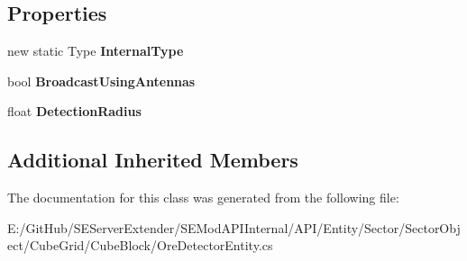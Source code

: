 \subsection*{Properties}
\begin{DoxyCompactItemize}
\item 
\hypertarget{class_s_e_mod_a_p_i_internal_1_1_a_p_i_1_1_entity_1_1_sector_1_1_sector_object_1_1_cube_grid_1_1734c0c906221c912328658de70b50f1a_a93da9667b8adff83b2e716f688764030}{}new static Type {\bfseries Internal\+Type}\label{class_s_e_mod_a_p_i_internal_1_1_a_p_i_1_1_entity_1_1_sector_1_1_sector_object_1_1_cube_grid_1_1734c0c906221c912328658de70b50f1a_a93da9667b8adff83b2e716f688764030}

\item 
\hypertarget{class_s_e_mod_a_p_i_internal_1_1_a_p_i_1_1_entity_1_1_sector_1_1_sector_object_1_1_cube_grid_1_1734c0c906221c912328658de70b50f1a_a3a35605dcc0e1ee788a25167d3be9a32}{}bool {\bfseries Broadcast\+Using\+Antennas}\label{class_s_e_mod_a_p_i_internal_1_1_a_p_i_1_1_entity_1_1_sector_1_1_sector_object_1_1_cube_grid_1_1734c0c906221c912328658de70b50f1a_a3a35605dcc0e1ee788a25167d3be9a32}

\item 
\hypertarget{class_s_e_mod_a_p_i_internal_1_1_a_p_i_1_1_entity_1_1_sector_1_1_sector_object_1_1_cube_grid_1_1734c0c906221c912328658de70b50f1a_a28eae8d4a3dd22b6ae3304aa7ddb9def}{}float {\bfseries Detection\+Radius}\label{class_s_e_mod_a_p_i_internal_1_1_a_p_i_1_1_entity_1_1_sector_1_1_sector_object_1_1_cube_grid_1_1734c0c906221c912328658de70b50f1a_a28eae8d4a3dd22b6ae3304aa7ddb9def}

\end{DoxyCompactItemize}
\subsection*{Additional Inherited Members}


The documentation for this class was generated from the following file\+:\begin{DoxyCompactItemize}
\item 
E\+:/\+Git\+Hub/\+S\+E\+Server\+Extender/\+S\+E\+Mod\+A\+P\+I\+Internal/\+A\+P\+I/\+Entity/\+Sector/\+Sector\+Object/\+Cube\+Grid/\+Cube\+Block/Ore\+Detector\+Entity.\+cs\end{DoxyCompactItemize}
